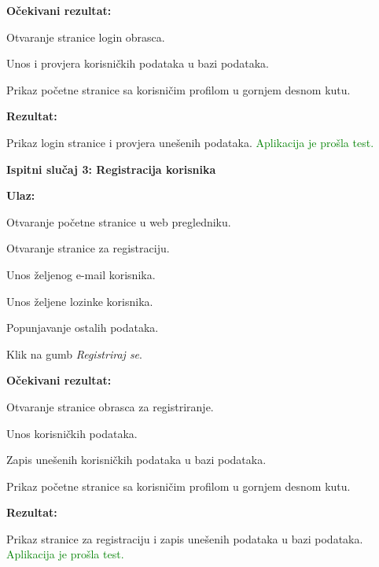  			\textnormal{\textbf{Očekivani rezultat:}}
 			
 			\begin{packed_enum}
 				\item Otvaranje stranice login obrasca.
 				\item Unos i provjera korisničkih podataka u bazi podataka.
 				\item Prikaz početne stranice sa korisničim profilom u gornjem desnom kutu.
 			\end{packed_enum}
 			
 			\textnormal{\textbf{Rezultat:}}
 			
 			\textnormal{Prikaz login stranice i provjera unešenih podataka. \textcolor{green}{Aplikacija je prošla test.}\\}
 			
 			\textnormal{\textbf{Ispitni slučaj 3: Registracija korisnika}\\}
 			
 			\textnormal{\textbf{Ulaz:}}
 			
 			\begin{packed_enum}
 				\item Otvaranje početne stranice u web pregledniku.
 				\item Otvaranje stranice za registraciju.
 				\item Unos željenog e-mail korisnika.
 				\item Unos željene lozinke korisnika.
 				\item Popunjavanje ostalih podataka.
 				\item Klik na gumb \textit{Registriraj se}.
 			\end{packed_enum}
 			
 			\textnormal{\textbf{Očekivani rezultat:}}
 			
 			\begin{packed_enum}
 				\item Otvaranje stranice obrasca za registriranje.
 				\item Unos korisničkih podataka.
 				\item Zapis unešenih korisničkih podataka u bazi podataka.
 				\item Prikaz početne stranice sa korisničim profilom u gornjem desnom kutu.
 			\end{packed_enum}
 			
 			\textnormal{\textbf{Rezultat:}}
 			
 			\textnormal{Prikaz stranice za registraciju i zapis unešenih podataka u bazi podataka. \textcolor{green}{Aplikacija je prošla test.}\\}
 			
